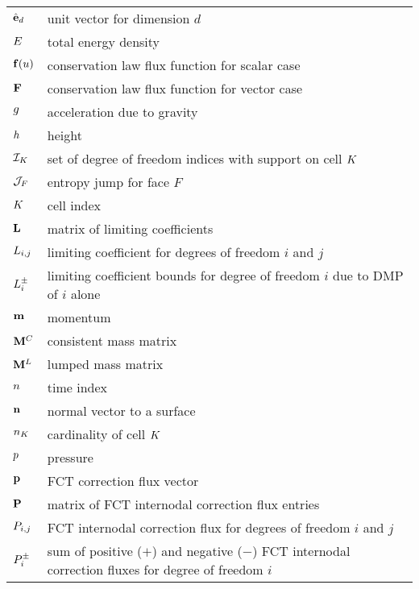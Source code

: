 \begin{center}
\begin{longtable}{l p{4.8in}}
$\hat{\mathbf{e}}_{d}$   & unit vector for dimension $d$\\
$E$     & total energy density\\
$\mathbf{f}(u)$  & conservation law flux function for scalar case\\
$\consfluxvector$  & conservation law flux function for vector case\\
$g$         & acceleration due to gravity\\
$h$          & height\\
$\indicescell$     & set of degree of freedom indices with support on
                     cell $K$\\
$\mathcal{J}_F$ & entropy jump for face $F$\\
$K$       & cell index\\

$\mathbf{L}$   & matrix of limiting coefficients\\
$L_{i,j}$ & limiting coefficient for degrees of freedom $i$
                         and $j$\\
$L^\pm_i$ & limiting coefficient bounds for degree of freedom $i$
                         due to DMP of $i$ alone\\
$\mathbf{m}$        & momentum\\
$\mathbf{M}^C$ & consistent mass matrix\\
$\mathbf{M}^L$ & lumped mass matrix\\

$n$       & time index\\
$\mathbf{n}$    & normal vector to a surface\\
$\cardinality$     & cardinality of cell $K$\\
$p$        & pressure\\
$\mathbf{p}$ & FCT correction flux vector\\
$\correctionfluxmatrix$ & matrix of FCT internodal correction flux entries\\
$\correctionfluxij$ & FCT internodal correction flux for degrees of freedom
                      $i$ and $j$\\
$\correctionfluxsumsi$ & sum of positive ($+$) and negative ($-$) FCT internodal
                         correction fluxes for degree of freedom $i$\\


\end{longtable}
\end{center}
